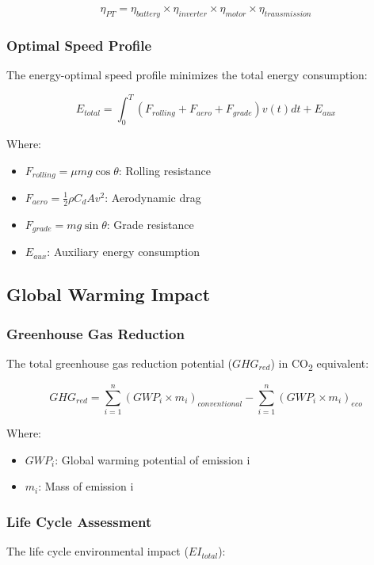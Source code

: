 \documentclass[12pt,a4paper]{article}
\begin{document}
\begin{equation}
\eta_{PT} = \eta_{battery} \times \eta_{inverter} \times \eta_{motor} \times \eta_{transmission}
\end{equation}

\subsubsection{Optimal Speed Profile}
The energy-optimal speed profile minimizes the total energy consumption:

\begin{equation}
E_{total} = \int_{0}^{T} (F_{rolling} + F_{aero} + F_{grade})v(t)dt + E_{aux}
\end{equation}

Where:
\begin{itemize}
    \item \(F_{rolling} = \mu mg\cos\theta\): Rolling resistance
    \item \(F_{aero} = \frac{1}{2}\rho C_dAv^2\): Aerodynamic drag
    \item \(F_{grade} = mg\sin\theta\): Grade resistance
    \item \(E_{aux}\): Auxiliary energy consumption
\end{itemize}

\subsection{Global Warming Impact}
\subsubsection{Greenhouse Gas Reduction}
The total greenhouse gas reduction potential (\(GHG_{red}\)) in CO\textsubscript{2} equivalent:

\begin{equation}
GHG_{red} = \sum_{i=1}^{n} (GWP_i \times m_i)_{conventional} - \sum_{i=1}^{n} (GWP_i \times m_i)_{eco}
\end{equation}

Where:
\begin{itemize}
    \item \(GWP_i\): Global warming potential of emission i
    \item \(m_i\): Mass of emission i
\end{itemize}

\subsubsection{Life Cycle Assessment}
The life cycle environmental impact (\(EI_{total}\)):
\end{document}
